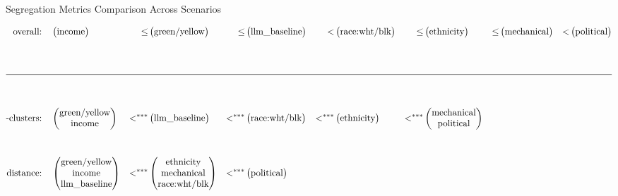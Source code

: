 \begin{table}[htbp]
\centering
\caption{Segregation Metrics Comparison Across Scenarios}
\label{tab:segregation_metrics}
\vspace{1.5em}
\begin{align*}
\text{overall:} & \quad \begin{pmatrix} \text{income} \end{pmatrix} & \leq & \begin{pmatrix} \text{green/yellow} \end{pmatrix} & \leq & \begin{pmatrix} \text{llm\_baseline} \end{pmatrix} & < & \begin{pmatrix} \text{race:wht/blk} \end{pmatrix} & \leq & \begin{pmatrix} \text{ethnicity} \end{pmatrix} & \leq & \begin{pmatrix} \text{mechanical} \end{pmatrix} & < & \begin{pmatrix} \text{political} \end{pmatrix} \\\\[2.5em]
\hline \\\\[0.5em]
\text{-clusters:} & \quad \begin{pmatrix} \text{green/yellow} \\ \text{income} \end{pmatrix} & <^{***} & \begin{pmatrix} \text{llm\_baseline} \end{pmatrix} & <^{***} & \begin{pmatrix} \text{race:wht/blk} \end{pmatrix} & <^{***} & \begin{pmatrix} \text{ethnicity} \end{pmatrix} & <^{***} & \begin{pmatrix} \text{mechanical} \\ \text{political} \end{pmatrix} \\\\[1em]
\text{distance:} & \quad \begin{pmatrix} \text{green/yellow} \\ \text{income} \\ \text{llm\_baseline} \end{pmatrix} & <^{***} & \begin{pmatrix} \text{ethnicity} \\ \text{mechanical} \\ \text{race:wht/blk} \end{pmatrix} & <^{***} & \begin{pmatrix} \text{political} \end{pmatrix} \\\\[2em]

\end{align*}
\end{table}
